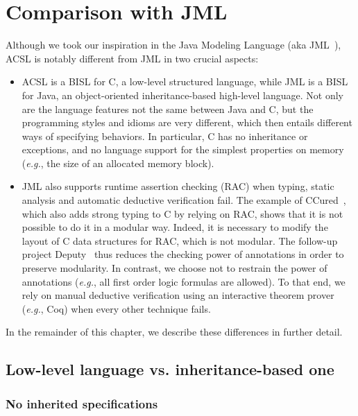 \section{Comparison with JML}
\label{sec:comp-jml}

Although we took our inspiration in the Java Modeling Language (aka
JML~\cite{jmlhomepage}), ACSL is notably different from JML in
two crucial aspects:

\begin{itemize}
\item ACSL is a BISL for C, a low-level structured language, while JML
  is a BISL for Java, an object-oriented inheritance-based high-level
  language. Not only are the language features not the same between Java and C, but the
  programming styles and idioms are very different, which then entails
  different ways of specifying behaviors. In particular, C has no
  inheritance or exceptions, and no language support for the simplest
  properties on memory (\emph{e.g.}, the size of an allocated memory block).
\item JML also supports runtime assertion checking (RAC) when typing,
  static analysis and automatic deductive verification fail. The
  example of CCured~\cite{necula02ccured,condit03ccured}, which also adds
  strong typing to C by relying on RAC, shows that it is not possible
  to do it in a modular way. Indeed, it is necessary to modify the
  layout of C data structures for RAC, which is not modular. The
  follow-up project Deputy~\cite{condit07deputy} thus reduces the
  checking power of annotations in order to preserve modularity.  In contrast, we choose not to restrain the power of annotations
  (\emph{e.g.}, all first order logic formulas are allowed). To that end, we
  rely on manual deductive verification using an interactive theorem
  prover (\emph{e.g.}, Coq) when every other technique fails.
\end{itemize}

\noindent
In the remainder of this chapter, we describe these differences in
further detail.

\subsection{Low-level language vs. inheritance-based one}

\subsubsection*{No inherited specifications}

